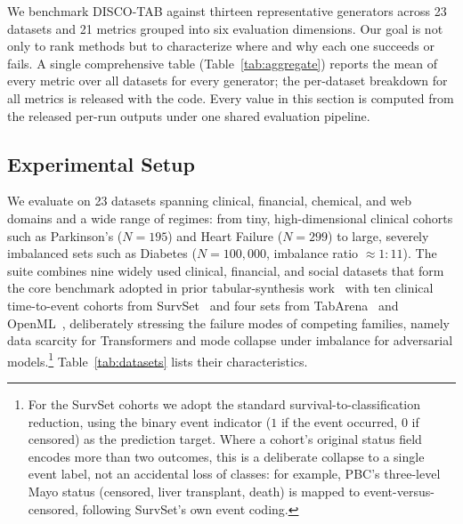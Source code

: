 We benchmark DISCO-TAB against thirteen representative generators across 23 datasets and 21 metrics grouped into six evaluation dimensions. Our goal is not only to rank methods but to characterize where and why each one succeeds or fails. A single comprehensive table (Table~\ref{tab:aggregate}) reports the mean of every metric over all datasets for every generator; the per-dataset breakdown for all metrics is released with the code. Every value in this section is computed from the released per-run outputs under one shared evaluation pipeline.

\subsection{Experimental Setup}

We evaluate on 23 datasets spanning clinical, financial, chemical, and web domains and a wide range of regimes: from tiny, high-dimensional clinical cohorts such as Parkinson's ($N=195$) and Heart Failure ($N=299$) to large, severely imbalanced sets such as Diabetes ($N=100{,}000$, imbalance ratio $\approx 1{:}11$). The suite combines nine widely used clinical, financial, and social datasets that form the core benchmark adopted in prior tabular-synthesis work~\cite{yang2025ptausingproximalpolicy,borisov2022language} with ten clinical time-to-event cohorts from SurvSet~\cite{drysdale2022survset} and four sets from TabArena~\cite{erickson2025tabarena} and OpenML~\cite{vanschoren2014openml}, deliberately stressing the failure modes of competing families, namely data scarcity for Transformers and mode collapse under imbalance for adversarial models.\footnote{For the SurvSet cohorts we adopt the standard survival-to-classification reduction, using the binary event indicator ($1$ if the event occurred, $0$ if censored) as the prediction target. Where a cohort's original status field encodes more than two outcomes, this is a deliberate collapse to a single event label, not an accidental loss of classes: for example, PBC's three-level Mayo status (censored, liver transplant, death) is mapped to event-versus-censored, following SurvSet's own event coding.} Table~\ref{tab:datasets} lists their characteristics.



